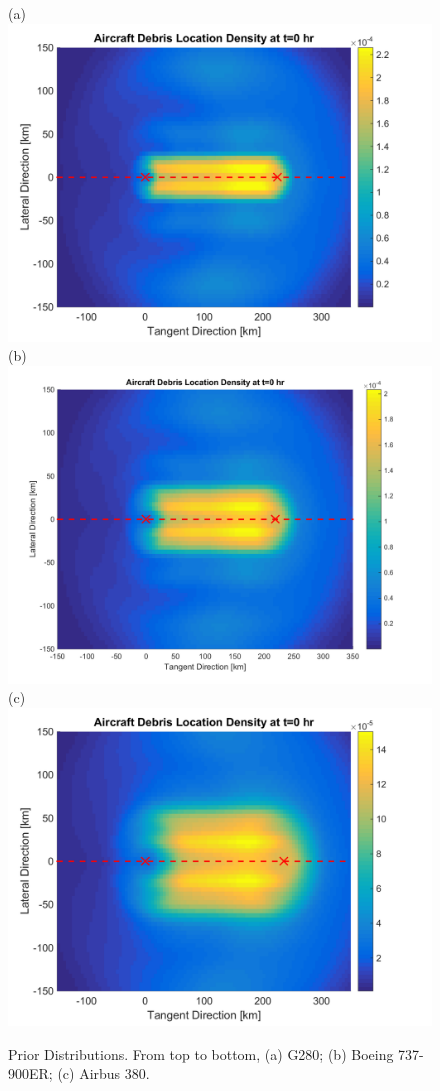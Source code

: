 \documentclass[12pt, letterpaper]{article}  %
\theoremstyle{definition}
\theoremstyle{remark}
\theoremstyle{plain}
\begin{document}
\begin{center}
	\begin{figure}[H]
		\centering
		 (a)\includegraphics[width=0.6\linewidth]{figures/G280_PriorDistribution1.png}\\
		 (b)\includegraphics[width=0.6\linewidth]{figures/B737-900ER_PriorDistribution1.png}\\
		 (c)\includegraphics[width=0.6\linewidth]{figures/Airbus380_PriorDistribution1.png}
		\caption{Prior Distributions. From top to bottom, (a) G280; (b) Boeing 737-900ER; (c) Airbus 380.}
		\label{fig:prior}
	\end{figure}
\end{center}




\end{document}
